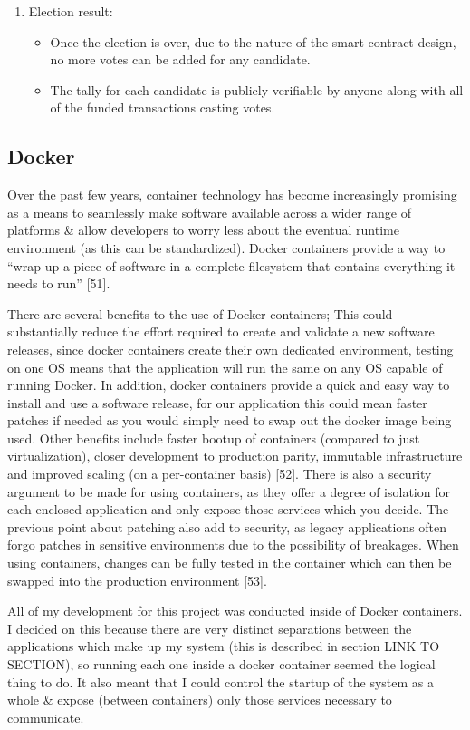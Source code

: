 \documentclass{article}
\begin{document}
\begin{enumerate}
\item Election result:
	\begin{itemize}
		\item Once the election is over, due to the nature of the smart contract design, no more votes can be added for any candidate.
		\item The tally for each candidate is publicly verifiable by anyone along with all of the funded transactions casting votes.
	\end{itemize}

\end{enumerate}

\cleardoublepage    
\subsection{Docker}
Over the past few years, container technology has become increasingly promising as a means to seamlessly make software available across a wider range of platforms \& allow developers to worry less about the eventual runtime environment (as this can be standardized). Docker containers provide a way to ``wrap up a piece of software in a complete filesystem that contains everything it needs to run'' {\LARGE [51]}.

There are several benefits to the use of Docker containers; This could substantially reduce the effort required to create and validate a new software releases, since docker containers create their own dedicated environment, testing on one OS means that the application will run the same on any OS capable of running Docker. In addition, docker containers provide a quick and easy way to install and use a software release, for our application this could mean faster patches if needed as you would simply need to swap out the docker image being used. Other benefits include faster bootup of containers (compared to just virtualization), closer development to production parity, immutable infrastructure and improved scaling (on a per-container basis) {\Large [52]}. There is also a security argument to be made for using containers, as they offer a degree of isolation for each enclosed application and only expose those services which you decide. The previous point about patching also add to security, as legacy applications often forgo patches in sensitive environments due to the possibility of breakages. When using containers, changes can be fully tested in the container which can then be swapped into the production environment {\LARGE [53]}.

All of my development for this project was conducted inside of Docker containers. I decided on this because there are very distinct separations between the applications which make up my system (this is described in section {\Large LINK TO SECTION}), so running each one inside a docker container seemed the logical thing to do. It also meant that I could control the startup of the system as a whole \& expose (between containers) only those services necessary to communicate.
\end{document}
